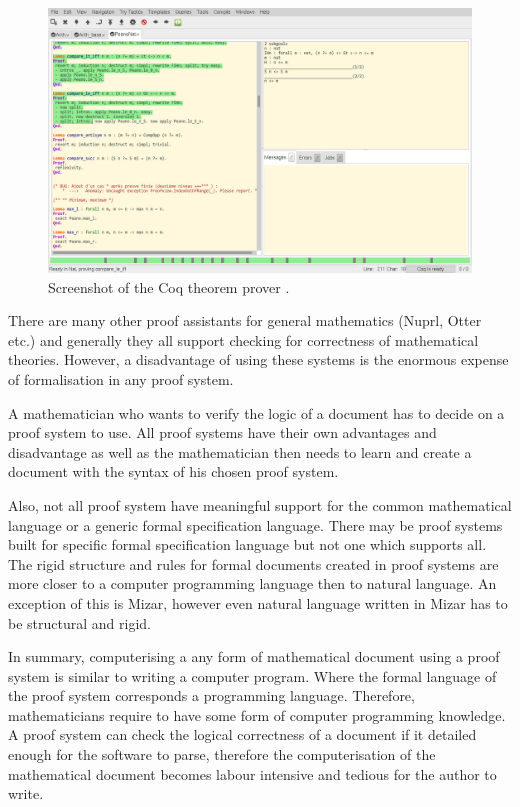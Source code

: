 \begin{figure}[H]
\begin{center}
\includegraphics[scale=0.4]{Figures/Background/coq.png}
\end{center}
\caption{Screenshot of the Coq theorem prover \cite{coq}. \label{fig:coq}}
\end{figure}

There are many other proof assistants for general mathematics (Nuprl, Otter etc.) and generally they all support checking for correctness of mathematical theories. However, a disadvantage of using these systems is the enormous expense of formalisation in any proof system. 

A mathematician who wants to verify the logic of a document has to decide on a proof system to use. All proof systems have their own advantages and disadvantage as well as the mathematician then needs to learn and create a document with the syntax of his chosen proof system.

Also, not all proof system have meaningful support for the common mathematical language or a generic formal specification language. There may be proof systems built for specific formal specification language but not one which supports all. The rigid structure and rules for formal documents created in proof systems are more closer to a computer programming language then to natural language. An exception of this is Mizar, however even natural language written in Mizar has to be structural and rigid.

In summary, computerising a any form of mathematical document using a proof system is similar to writing a computer program. Where the formal language of the proof system corresponds a programming language. Therefore, mathematicians require to have some form of computer programming knowledge. A proof system can check the logical correctness of a document if it detailed enough for the software to parse, therefore the computerisation of the mathematical document becomes labour intensive and tedious for the author to write.

